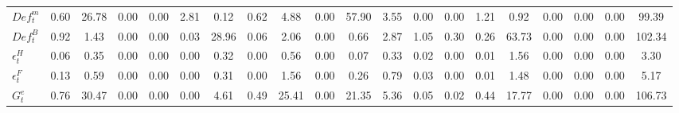\begin{center}
\begin{longtable}{lccccccccccccccccccc}
$ Def^m_t                   $	 & 	                0.60	 & 	               26.78	 & 	                0.00	 & 	                0.00	 & 	                2.81	 & 	                0.12	 & 	                0.62	 & 	                4.88	 & 	                0.00	 & 	               57.90	 & 	                3.55	 & 	                0.00	 & 	                0.00	 & 	                1.21	 & 	                0.92	 & 	                0.00	 & 	                0.00	 & 	                0.00	 & 	               99.39 \\ 
$ Def^B_t                   $	 & 	                0.92	 & 	                1.43	 & 	                0.00	 & 	                0.00	 & 	                0.03	 & 	               28.96	 & 	                0.06	 & 	                2.06	 & 	                0.00	 & 	                0.66	 & 	                2.87	 & 	                1.05	 & 	                0.30	 & 	                0.26	 & 	               63.73	 & 	                0.00	 & 	                0.00	 & 	                0.00	 & 	              102.34 \\ 
$ \epsilon^H_t              $	 & 	                0.06	 & 	                0.35	 & 	                0.00	 & 	                0.00	 & 	                0.00	 & 	                0.32	 & 	                0.00	 & 	                0.56	 & 	                0.00	 & 	                0.07	 & 	                0.33	 & 	                0.02	 & 	                0.00	 & 	                0.01	 & 	                1.56	 & 	                0.00	 & 	                0.00	 & 	                0.00	 & 	                3.30 \\ 
$ \epsilon^F_t              $	 & 	                0.13	 & 	                0.59	 & 	                0.00	 & 	                0.00	 & 	                0.00	 & 	                0.31	 & 	                0.00	 & 	                1.56	 & 	                0.00	 & 	                0.26	 & 	                0.79	 & 	                0.03	 & 	                0.00	 & 	                0.01	 & 	                1.48	 & 	                0.00	 & 	                0.00	 & 	                0.00	 & 	                5.17 \\ 
$ G^e_t                     $	 & 	                0.76	 & 	               30.47	 & 	                0.00	 & 	                0.00	 & 	                0.00	 & 	                4.61	 & 	                0.49	 & 	               25.41	 & 	                0.00	 & 	               21.35	 & 	                5.36	 & 	                0.05	 & 	                0.02	 & 	                0.44	 & 	               17.77	 & 	                0.00	 & 	                0.00	 & 	                0.00	 & 	              106.73 \\ 

\end{longtable}
\end{center}
